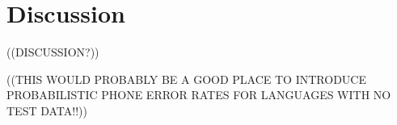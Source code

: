\section{Discussion}

((DISCUSSION?))

((THIS WOULD PROBABLY BE A GOOD PLACE TO INTRODUCE PROBABILISTIC PHONE ERROR RATES FOR LANGUAGES WITH NO TEST DATA!!))
